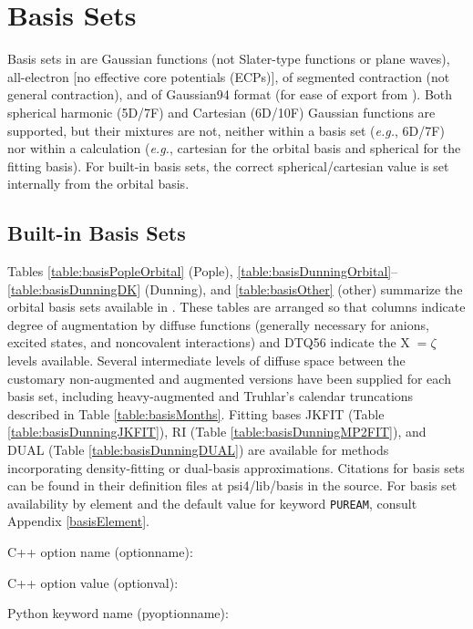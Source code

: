 \section{Basis Sets}

Basis sets in \PSIfour are Gaussian functions (not Slater-type functions or plane waves), 
all-electron [no effective core potentials (ECPs)], of segmented contraction (not general contraction), 
and of Gaussian94 format (for ease of export from ). 
Both spherical harmonic (5D/7F) and Cartesian (6D/10F) Gaussian functions are supported, 
but their mixtures are not, neither within a basis set (\textit{e.g.}, 6D/7F) nor within a calculation
(\textit{e.g.}, cartesian for the orbital basis and spherical for the fitting basis).
For built-in basis sets, the correct spherical/cartesian value is set internally from the orbital basis.


\subsection{Built-in Basis Sets}
Tables \ref{table:basisPopleOrbital} (Pople), \ref{table:basisDunningOrbital}--\ref{table:basisDunningDK} (Dunning), 
and \ref{table:basisOther} (other) summarize the orbital basis sets available in \PSIfour. 
These tables are arranged so that columns indicate degree of augmentation by diffuse functions 
(generally necessary for anions, excited states, and noncovalent interactions)
and DTQ56 indicate the X$\;=\zeta$ levels available.
Several intermediate levels of diffuse space between the customary non-augmented and augmented versions have been
supplied for each basis set, including heavy-augmented and Truhlar's\cite{Papajak:2011:10} calendar truncations 
described in Table \ref{table:basisMonths}.
Fitting bases JKFIT (Table \ref{table:basisDunningJKFIT}), RI (Table \ref{table:basisDunningMP2FIT}), and
DUAL (Table \ref{table:basisDunningDUAL}) are available for methods incorporating density-fitting or
dual-basis approximations.
Citations for basis sets can be found in their definition files at psi4/lib/basis in the source.
For basis set availability by element and the default value for keyword \texttt{PUREAM}, consult Appendix \ref{basisElement}.

C++ option name (optionname): 

C++ option value (optionval): 

Python keyword name (pyoptionname): 

